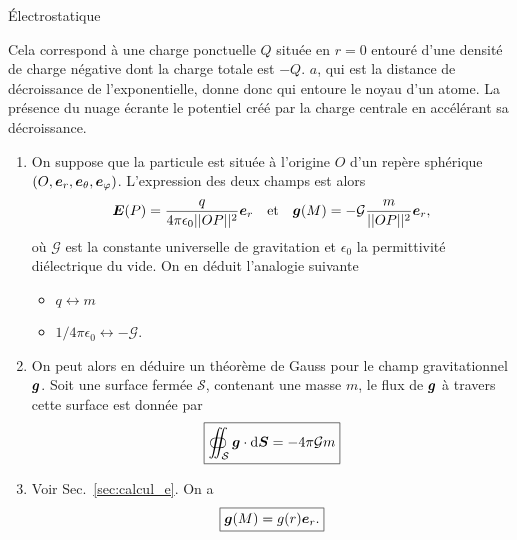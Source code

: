 \begin{corr}{Électrostatique}
\begin{enumerate}
	  Cela correspond à une charge ponctuelle $Q$ située en $r = 0$ entouré
	  d'une densité de charge négative dont la charge totale est $-Q$. $a$,
	  qui est la distance de décroissance de l'exponentielle, donne donc  qui entoure le noyau d'un atome.
	  La présence du nuage écrante le potentiel créé par la charge centrale
	  en accélérant sa décroissance.
\end{enumerate}




	\begin{enumerate}
		\item On suppose que la particule est située à l'origine $O$ d'un repère
		sphérique $(O, \er, \etheta, \ephi)$. L'expression des deux champs est alors
		\begin{equation*}
			\vece(P) = \dfrac{q}{4 \pi \epsilon_0 ||OP||^2}\er
			\quad \mathrm{et} \quad \vecg(M) = 
			-\mathcal{G} \dfrac{m}{||OP||^2}\er,
		\end{equation*}
		où $\mathcal{G}$ est la constante universelle de gravitation
		et $\epsilon_0$ la permittivité diélectrique du vide.
		On en déduit l'analogie suivante
		\begin{itemize}
			\item $q \longleftrightarrow m$
			\item $1/4\pi \epsilon_0 \longleftrightarrow -\mathcal{G}$.
		\end{itemize}
	\item On peut alors en déduire un théorème de Gauss pour le champ
		gravitationnel $\vecg$. Soit une surface fermée $\mathcal{S}$,
		contenant une masse $m$, le flux de $\vecg$ à travers cette surface
		est donnée par
	      \begin{equation*}
		      \boxed{\oiint_\mathcal{S} \vecg \cdot \ds = - 4\pi \mathcal{G}m}
	      \end{equation*}
	\item Voir Sec.~\ref{sec:calcul_e}. On a 
	\begin{equation*}
		\boxed{\vecg(M) = g(r) \er.}
	\end{equation*}


\end{enumerate}
\end{corr}
